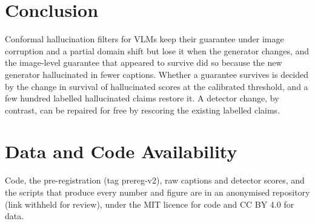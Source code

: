 \documentclass[journal]{IEEEtran}
\newif\ifanon\anontrue
\theoremstyle{remark}\newtheorem{remark}{Remark}
\newcommand{\repo}{\ifanon an anonymised repository (link withheld for review)\else
  \url{https://github.com/antonyjasfer/Budget-Coupled-Robust-Belief-Propagation-for-Visual-Hallucination-Detection}\fi}
\begin{document}
\section{Conclusion}
Conformal hallucination filters for VLMs keep their guarantee under image corruption and a partial domain shift but lose it when the generator changes, and the image-level guarantee that appeared to survive did so because the new generator hallucinated in fewer captions. Whether a guarantee survives is decided by the change in survival of hallucinated scores at the calibrated threshold, and a few hundred labelled hallucinated claims restore it. A detector change, by contrast, can be repaired for free by rescoring the existing labelled claims.

\section*{Data and Code Availability}
Code, the pre-registration (tag prereg-v2), raw captions and detector scores, and the scripts that produce every number and figure are in \repo{}\ifanon\else{} and on Zenodo (\url{https://doi.org/10.5281/zenodo.23810032})\fi, under the MIT licence for code and CC BY 4.0 for data.


\appendices
\end{document}
